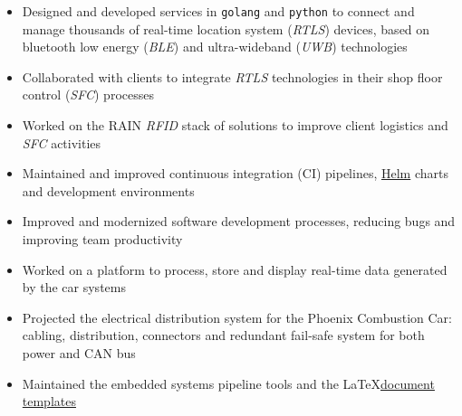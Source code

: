 \documentclass[9pt,a4paper,ragged2e,withhyper]{altacv}
\begin{document}
\begin{paracol}{2}


\begin{itemize}
  \item Designed and developed services in \texttt{golang} and \texttt{python} to connect and manage thousands of real-time location system (\textit{RTLS}) devices, based on bluetooth low energy (\textit{BLE}) and ultra-wideband (\textit{UWB}) technologies
  \item Collaborated with clients to integrate \textit{RTLS} technologies in their shop floor control (\textit{SFC}) processes
  \item Worked on the RAIN \textit{RFID} stack of solutions to improve client logistics and \textit{SFC} activities
  \item Maintained and improved continuous integration (CI) pipelines, \href{https://helm.sh/}{Helm} charts and development environments
  \item Improved and modernized software development processes, reducing bugs and improving team productivity
\end{itemize}


\begin{itemize}
  \item Worked on a platform to process, store and display real-time data generated by the car systems
  \item Projected the electrical distribution system for the Phoenix Combustion Car: cabling, distribution, connectors and redundant fail-safe system for both power and CAN bus
  \item Maintained the embedded systems pipeline tools and the \LaTeX \linebreak \href{https://github.com/engeniusua/engenius-ua-latex-template}{document templates}
\end{itemize}




\end{paracol}
\end{document}
